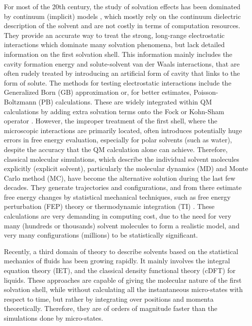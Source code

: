 For most of the 20th century, the study of solvation effects has been
dominated by continuum (implicit) models \citep{Jensen,Cramer_1999},
which mostly rely on the continuum dielectric description of the solvent
and are not costly in terms of computation resources. They provide
an accurate way to treat the strong, long-range electrostatic interactions
which dominate many solvation phenomena, but lack detailed information
on the first solvation shell. This information mainly includes the
cavity formation energy and solute-solvent van der Waals interactions,
that are often rudely treated by introducing an artificial form of
cavity that links to the form of solute. The methods for testing electrostatic
interactions include the Generalized Born (GB) approximation or, for
better estimates, Poisson-Boltzmann (PB) calculations. These are widely
integrated within \acs{QM} calculations by adding extra solvation
terms onto the Fock or Kohn-Sham operator \citep{Tomasi_1994_implicit_model,tomasi_quantum_2005}.
However, the improper treatment of the first shell, where the microscopic
interactions are primarily located, often introduces potentially huge
errors in free energy evaluation, especially for polar solvents (such
as water), despite the accuracy that the \acs{QM} calculation alone
can achieve. Therefore, classical molecular simulations, which describe
the individual solvent molecules explicitly (explicit solvent), particularly
the molecular dynamics (\acs{MD}) and Monte Carlo method (\acs{MC}),
have become the alternative solution during the last few decades.
They generate trajectories and configurations, and from there estimate
free energy changes by statistical mechanical techniques, such as
free energy perturbation (FEP) theory or thermodynamic integration
(TI) \citep{Jorgensen_1995_MC}. These calculations are very demanding
in computing cost, due to the need for very many (hundreds or thousands)
solvent molecules to form a realistic model, and very many configurations
(millions) to be statistically significant.

Recently, a third domain of theory to describe solvents based on the
statistical mechanics of fluids has been growing rapidly. It mainly
involves the integral equation theory (\acs{IET}), and the classical
density functional theory (c\acs{DFT}) for liquids. These approaches
are capable of giving the molecular nature of the first solvation
shell, while without calculating all the instantaneous micro-states
with respect to time, but rather by integrating over positions and
momenta theoretically. Therefore, they are of orders of magnitude
faster than the simulations done by micro-states.

